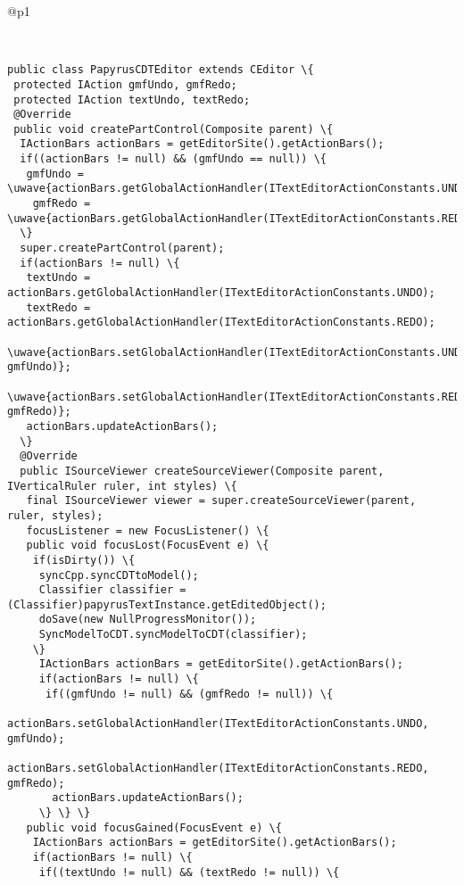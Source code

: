 



\begin{figure*}[!htb]
 \begin{minipage}{1\textwidth}
\scriptsize 
\begin{tabular}{@{}p{}} 
 \hline 

   \\ \hline
  \vspace{-4mm}
\begin{Verbatim}[commandchars=\\\{\}, tabsize=2]
public class PapyrusCDTEditor extends CEditor \{
 protected IAction gmfUndo, gmfRedo;
 protected IAction textUndo, textRedo;
 @Override
 public void createPartControl(Composite parent) \{
  IActionBars actionBars = getEditorSite().getActionBars();
  if((actionBars != null) && (gmfUndo == null)) \{
   gmfUndo =  \uwave{actionBars.getGlobalActionHandler(ITextEditorActionConstants.UNDO)};
    gmfRedo =  \uwave{actionBars.getGlobalActionHandler(ITextEditorActionConstants.REDO)};
  \}
  super.createPartControl(parent);
  if(actionBars != null) \{
   textUndo = actionBars.getGlobalActionHandler(ITextEditorActionConstants.UNDO);
   textRedo = actionBars.getGlobalActionHandler(ITextEditorActionConstants.REDO);
    \uwave{actionBars.setGlobalActionHandler(ITextEditorActionConstants.UNDO, gmfUndo)};
    \uwave{actionBars.setGlobalActionHandler(ITextEditorActionConstants.REDO, gmfRedo)};
   actionBars.updateActionBars();
  \}
  @Override
  public ISourceViewer createSourceViewer(Composite parent, IVerticalRuler ruler, int styles) \{
   final ISourceViewer viewer = super.createSourceViewer(parent, ruler, styles);
   focusListener = new FocusListener() \{
   public void focusLost(FocusEvent e) \{
    if(isDirty()) \{
     syncCpp.syncCDTtoModel();
     Classifier classifier = (Classifier)papyrusTextInstance.getEditedObject();
     doSave(new NullProgressMonitor());
     SyncModelToCDT.syncModelToCDT(classifier);
    \}
     IActionBars actionBars = getEditorSite().getActionBars();
     if(actionBars != null) \{
      if((gmfUndo != null) && (gmfRedo != null)) \{
       actionBars.setGlobalActionHandler(ITextEditorActionConstants.UNDO, gmfUndo);
       actionBars.setGlobalActionHandler(ITextEditorActionConstants.REDO, gmfRedo);
       actionBars.updateActionBars();
     \} \} \}
   public void focusGained(FocusEvent e) \{
    IActionBars actionBars = getEditorSite().getActionBars();
    if(actionBars != null) \{
     if((textUndo != null) && (textRedo != null)) \{

\end{Verbatim}
\end{tabular}
\end{minipage}
\end{figure*}
